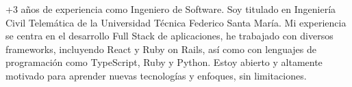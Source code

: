 

\begin{cvparagraph}
  +3 años de experiencia como Ingeniero de Software. Soy titulado en Ingeniería Civil Telemática de la 
  Universidad Técnica Federico Santa María. Mi experiencia se centra en el desarrollo Full Stack de aplicaciones, 
  he trabajado con diversos frameworks, incluyendo React y Ruby on Rails, así como con lenguajes de programación 
  como TypeScript, Ruby y Python. Estoy abierto y altamente motivado para aprender nuevas tecnologías y enfoques, 
  sin limitaciones.
\end{cvparagraph}
